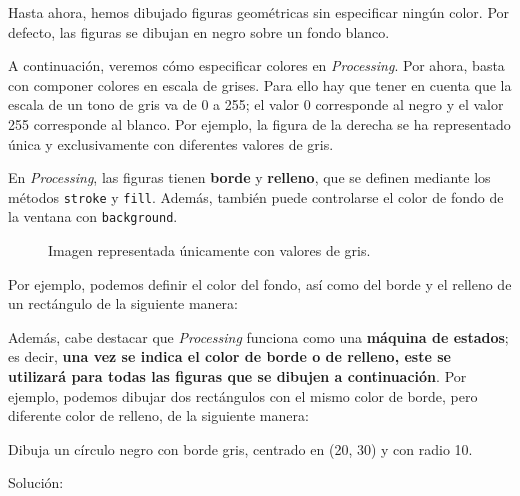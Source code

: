 \documentclass[
  spanish,
  11pt,
  a4paper,
  DIV=11,
  numbers=noendperiod]{scrartcl}
\begin{document}
\label{escala-de-grises}

Hasta ahora, hemos dibujado figuras geométricas sin especificar ningún color. Por defecto, las figuras se dibujan en negro sobre un fondo blanco.

A continuación, veremos cómo especificar colores en \emph{Processing}. Por ahora, basta con componer colores en escala de grises. Para ello hay que tener en cuenta que la escala de un tono de gris va de 0 a 255; el valor 0 corresponde al negro y el valor 255 corresponde al blanco. Por ejemplo, la figura de la derecha se ha representado única y exclusivamente con diferentes valores de gris.

En \emph{Processing}, las figuras tienen \textbf{borde} y \textbf{relleno}, que se definen mediante los métodos \texttt{stroke} y \texttt{fill}. Además, también puede controlarse el color de fondo de la ventana con \texttt{background}.

\begin{figure}

\caption{\label{fig-grayscale}Imagen representada únicamente con valores de gris.}

\end{figure}%

Por ejemplo, podemos definir el color del fondo, así como del borde y el relleno de un rectángulo de la siguiente manera:


Además, cabe destacar que \emph{Processing} funciona como una \textbf{máquina de estados}; es decir, \textbf{una vez se indica el color de borde o de relleno, este se utilizará para todas las figuras que se dibujen a continuación}. Por ejemplo, podemos dibujar dos rectángulos con el mismo color de borde, pero diferente color de relleno, de la siguiente manera:


\begin{tcolorbox}[enhanced jigsaw, toprule=.15mm, coltitle=black, titlerule=0mm, opacitybacktitle=0.6, breakable, colback=white, colframe=quarto-callout-note-color-frame, colbacktitle=quarto-callout-note-color!10!white, opacityback=0, title={Ejercicio 7 - Círculo y colores}, bottomtitle=1mm, rightrule=.15mm, toptitle=1mm, left=2mm, bottomrule=.15mm, leftrule=.75mm, arc=.35mm]

Dibuja un círculo negro con borde gris, centrado en (20, 30) y con radio 10.

Solución:


\end{tcolorbox}
\end{document}
